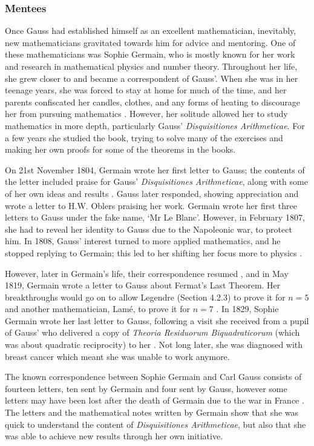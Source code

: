 \documentclass{article}
\begin{document}
\subsubsection{Mentees}

Once Gauss had established himself as an excellent mathematician, inevitably, new mathematicians gravitated towards him for advice and mentoring. One of these mathematicians was Sophie Germain, who is mostly known for her work and research in mathematical physics and number theory. Throughout her life, she grew closer to and became a correspondent of Gauss'. When she was in her teenage years, she was forced to stay at home for much of the time, and her parents confiscated her candles, clothes, and any forms of heating to discourage her from pursuing mathematics \cite{fermat}. However, her solitude allowed her to study mathematics in more depth, particularly Gauss' \textit{Disquisitiones Arithmeticae}. For a few years she studied the book, trying to solve many of the exercises and making her own proofs for some of the theorems in the books.

On 21st November 1804, Germain wrote her first letter to Gauss; the contents of the letter included praise for Gauss' \textit{Disquisitiones Arithmeticae}, along with some of her own ideas and results \cite{germaincorrespondence}. Gauss later responded, showing appreciation and wrote a letter to H.W. Oblers praising her work. Germain wrote her first three letters to Gauss under the fake name, `Mr Le Blanc'. However, in February 1807, she had to reveal her identity to Gauss due to the Napoleonic war, to protect him. In 1808, Gauss' interest turned to more applied mathematics, and he stopped replying to Germain; this led to her shifting her focus more to physics \cite{fermat}. 

However, later in Germain's life, their correspondence resumed \cite{fermat}, and in May 1819, Germain wrote a letter to Gauss about Fermat’s Last Theorem. Her breakthroughs would go on to allow Legendre (Section 4.2.3) to prove it for \(n = 5\) and another mathematician, Lamé, to prove it for \(n = 7\) \cite{fermat}. In 1829, Sophie Germain wrote her last letter to Gauss, following a visit she received from a pupil of Gauss’ who delivered a copy of \textit{Theoria Residuorum Biquadraticorum} (which was about quadratic reciprocity) to her \cite{germaincorrespondence}. Not long later, she was diagnosed with breast cancer which meant she was unable to work anymore. 

The known correspondence between Sophie Germain and Carl Gauss consists of fourteen letters, ten sent by Germain and four sent by Gauss, however some letters may have been lost after the death of Germain due to the war in France \cite{germaincorrespondence}. The letters and the mathematical notes written by Germain show that she was quick to understand the content of \textit{Disquisitiones Arithmeticae}, but also that she was able to achieve new results through her own initiative. 
\end{document}
